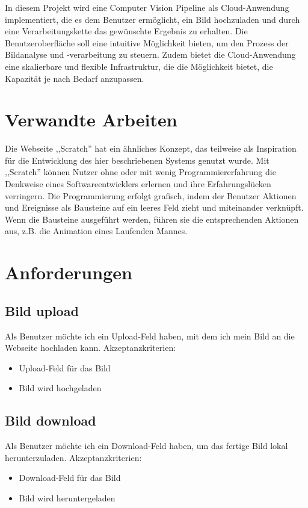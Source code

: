 \documentclass[conference]{IEEEtran}
\begin{document}
In diesem Projekt wird eine Computer Vision Pipeline als Cloud-Anwendung implementiert, die es dem Benutzer ermöglicht, ein Bild hochzuladen und durch eine Verarbeitungskette das gewünschte Ergebnis zu erhalten. Die Benutzeroberfläche soll eine intuitive Möglichkeit bieten, um den Prozess der Bildanalyse und -verarbeitung zu steuern. Zudem bietet die Cloud-Anwendung eine skalierbare und flexible Infrastruktur, die die Möglichkeit bietet, die Kapazität je nach Bedarf anzupassen.

\section{Verwandte Arbeiten}

Die Webseite ,,Scratch” \cite{scratch} hat ein ähnliches Konzept, das teilweise als Inspiration für die Entwicklung des hier beschriebenen Systems genutzt wurde. Mit ,,Scratch” können Nutzer ohne oder mit wenig Programmiererfahrung die Denkweise eines Softwareentwicklers erlernen und ihre Erfahrungslücken verringern. Die Programmierung erfolgt grafisch, indem der Benutzer Aktionen und Ereignisse als Bausteine auf ein leeres Feld zieht und miteinander verknüpft. Wenn die Bausteine ausgeführt werden, führen sie die entsprechenden Aktionen aus, z.B. die Animation eines Laufenden Mannes.

\section{Anforderungen}

\subsection{Bild upload}
Als Benutzer möchte ich ein Upload-Feld haben, mit dem ich mein Bild an die Webseite hochladen kann.
Akzeptanzkriterien: 
\begin{itemize}
	\item Upload-Feld für das Bild
	\item Bild wird hochgeladen
\end{itemize}

\subsection{Bild download}
Als Benutzer möchte ich ein Download-Feld haben, um das fertige Bild lokal herunterzuladen.
Akzeptanzkriterien: 
\begin{itemize}
	\item Download-Feld für das Bild
	\item Bild wird heruntergeladen
\end{itemize}
\end{document}
